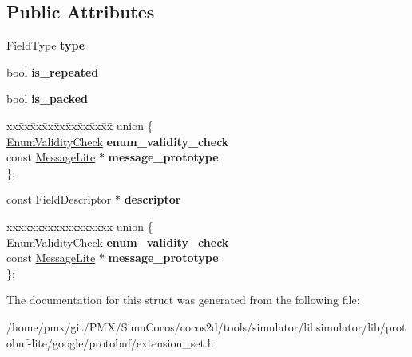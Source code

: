 \subsection*{Public Attributes}
\begin{DoxyCompactItemize}
\item 
\mbox{\label{structgoogle_1_1protobuf_1_1internal_1_1ExtensionInfo_a0035872f8952f2694eba5bdb99a839be}} 
Field\+Type {\bfseries type}
\item 
\mbox{\label{structgoogle_1_1protobuf_1_1internal_1_1ExtensionInfo_a9615a39d020325ada5015c6277171ca9}} 
bool {\bfseries is\+\_\+repeated}
\item 
\mbox{\label{structgoogle_1_1protobuf_1_1internal_1_1ExtensionInfo_a8e4d0964f1b22366e0b6de6121738660}} 
bool {\bfseries is\+\_\+packed}
\item 
\mbox{\label{structgoogle_1_1protobuf_1_1internal_1_1ExtensionInfo_a05fe45e5a259c42bba8faa2ae9705c54}} 
\begin{tabbing}
xx\=xx\=xx\=xx\=xx\=xx\=xx\=xx\=xx\=\kill
union \{\\
\>\hyperlink{structgoogle_1_1protobuf_1_1internal_1_1ExtensionInfo_1_1EnumValidityCheck}{EnumValidityCheck} {\bfseries enum\_validity\_check}\\
\>const \hyperlink{classgoogle_1_1protobuf_1_1MessageLite}{MessageLite} $\ast$ {\bfseries message\_prototype}\\
\}; \\

\end{tabbing}\item 
\mbox{\label{structgoogle_1_1protobuf_1_1internal_1_1ExtensionInfo_a02997b48c5ca2cab71caf439c3ef997b}} 
const Field\+Descriptor $\ast$ {\bfseries descriptor}
\item 
\mbox{\label{structgoogle_1_1protobuf_1_1internal_1_1ExtensionInfo_a99f60e8c4bfa87a0564f00ce0cea8aeb}} 
\begin{tabbing}
xx\=xx\=xx\=xx\=xx\=xx\=xx\=xx\=xx\=\kill
union \{\\
\>\hyperlink{structgoogle_1_1protobuf_1_1internal_1_1ExtensionInfo_1_1EnumValidityCheck}{EnumValidityCheck} {\bfseries enum\_validity\_check}\\
\>const \hyperlink{classgoogle_1_1protobuf_1_1MessageLite}{MessageLite} $\ast$ {\bfseries message\_prototype}\\
\}; \\

\end{tabbing}\end{DoxyCompactItemize}


The documentation for this struct was generated from the following file\+:\begin{DoxyCompactItemize}
\item 
/home/pmx/git/\+P\+M\+X/\+Simu\+Cocos/cocos2d/tools/simulator/libsimulator/lib/protobuf-\/lite/google/protobuf/extension\+\_\+set.\+h\end{DoxyCompactItemize}
